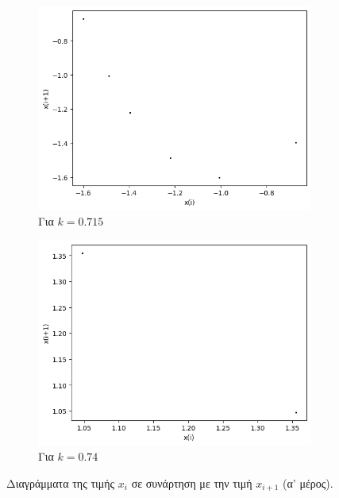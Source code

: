 \begin{figure}[ht]
\begin{subfigure}[b]{0.4\textwidth}
		\includegraphics[width=\textwidth]{LateX images/graphs q16/g15}
		\caption{Για $k=0.715$}
		\label{f:k86}
	\end{subfigure}
	\hfill
	\begin{subfigure}[b]{0.4\textwidth}
		\centering
		\includegraphics[width=\textwidth]{LateX images/graphs q16/g16}
		\caption{Για $k=0.74$}
		\label{f:k87}
	\end{subfigure}
	\hfill
	
	\caption{Διαγράμματα της τιμής \(x_i\) σε συνάρτηση με την τιμή \(x_{i+1}\) (α' μέρος).}
	\label{f:k240}
\end{figure}

